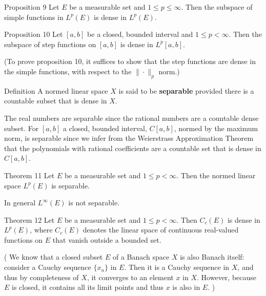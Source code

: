 \begin{namedthm*}{Proposition 9}
	Let $E$ be a measurable set and $1\le p\le\infty$.
	Then the subspace of simple functions in $L^p(E)$ is dense in $L^p(E)$.
\end{namedthm*}
\begin{namedthm*}{Proposition 10}
	Let $[a,b]$ be a closed, bounded interval and $1\le p<\infty$.
	Then the subspace of step functions on $[a,b]$ is dense in $L^p[a,b]$.
\end{namedthm*}
(To prove proposition 10, it suffices to show that the step functions are dense in the simple functions, with respect to the $\|\cdot\|_p$ norm.)
\begin{namedthm*}{Definition}
	A normed linear space $X$ is said to be \textbf{separable} provided there is a countable subset that is dense in $X$.
\end{namedthm*}
The real numbers are separable since the rational numbers are a countable dense subset.
For $[a,b]$ a closed, bounded interval, $C[a,b]$, normed by the maximum norm, is separable since we infer from the Weierstrass Approximation Theorem that the polynomials with rational coefficients are a countable set that is dense in $C[a,b]$.
\begin{namedthm*}{Theorem 11}
	Let $E$ be a measurable set and $1\le p<\infty$.
	Then the normed linear space $L^p(E)$ is separable.
\end{namedthm*}
In general $L^\infty(E)$ is not separable.
\begin{namedthm*}{Theorem 12}
	Let $E$ be a measurable set and $1\le p<\infty$.
	Then $C_c(E)$ is dense in $L^p(E)$, where $C_c(E)$ denotes the linear space of continuous real-valued functions on $E$ that vanish outside a bounded set.
\end{namedthm*}

(
	We know that a closed subset $E$ of a Banach space $X$ is also Banach itself: 
	consider a Cauchy sequence $\{x_n\}$ in $E$. 
	Then it is a Cauchy sequence in $X$, and thus by completeness of $X$, it converges to an element $x$ in $X$.
	However, because $E$ is closed, it contains all its limit points and thus $x$ is also in $E$.
)

